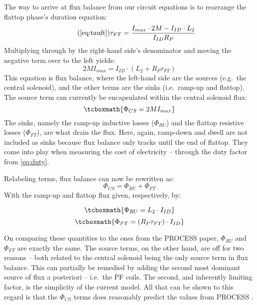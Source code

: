 The way to arrive at flux balance from our circuit equations is to rearrange the flattop phase's duration equation:
\begin{equation}
	\tag{\ref{eq:tauft}}
	\tau_{FT} = \frac{ I_{max} \cdot 2 M - I_{ID} \cdot  L_2 }{I_{ID} R_P}
\end{equation}
Multiplying through by the right-hand side's denominator and moving the negative term over to the left yields:
\begin{equation}
	2 M I_{max} = I_{ID} \cdot \left( L_2 + R_P \tau_{FT} \right)
\end{equation}
This equation is flux balance, where the left-hand side are the sources (e.g.\ the central solenoid), and the other terms are the sinks (i.e.\ ramp-up and flattop). The source term can currently be encapsulated within the central solenoid flux:
\begin{equation}
	\label{eq:phics}
	\tcboxmath{
	\Phi_{CS} = 2 M I_{max}
	}
\end{equation}
The sinks, namely the ramp-up inductive losses ($\Phi_{RU}$) and the flattop resistive losses ($\Phi_{FT}$), are what drain the flux. Here, again, ramp-down and dwell are not included as sinks because flux balance only tracks until the end of flattop. They come into play when measuring the cost of electricity -- through the duty factor from \cref{eq:duty}.

Relabeling terms, flux balance can now be rewritten as:
\begin{equation}
	\Phi_{CS} = \Phi_{RU} + \Phi_{FT}
\end{equation}
With the ramp-up and flattop flux given, respectively, by:

\begin{equation}
	\label{eq:phiru}
	\tcboxmath{
	\Phi_{RU} = L_2 \cdot I_{ID}
	}
\end{equation}
\begin{equation}
	\label{eq:phift}
	\tcboxmath{
	\Phi_{FT} = ( R_P \tau_{FT} ) \cdot I_{ID}
	}
\end{equation}

On comparing these quantities to the ones from the PROCESS paper,\cite{process} $\Phi_{RU}$ and $\Phi_{FT}$ are exactly the same. The source terms, on the other hand, are off for two reasons -- both related to the central solenoid being the only source term in flux balance. This can partially be remedied by adding the second most dominant source of flux a posteriori -- i.e.\ the PF coils. The second, and inherently limiting factor, is the simplicity of the current model. All that can be shown to this regard is that the $\Phi_{CS}$ terms does reasonably predict the values from  PROCESS .\cite{inputfile}

